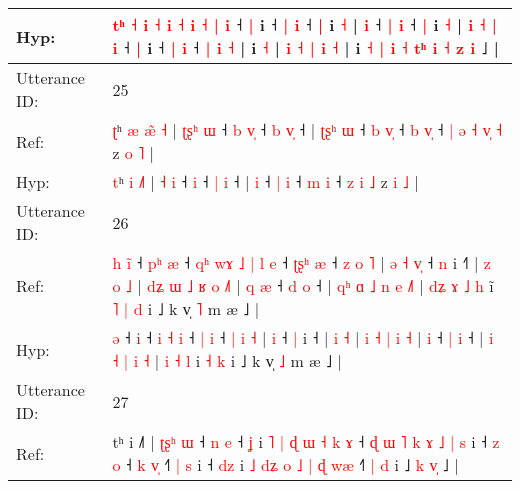 \documentclass[10pt]{article}
\DeclareRobustCommand{\hl}[1]{{\textcolor{red}{#1}}}
\begin{document}
\begin{longtable}{ll}
 \\
Hyp: & \hl{}\hl{}\hl{}\hl{}\hl{t}\hl{ʰ} \hl{}\hl{˧} \hl{i} \hl{˧} \hl{}\hl{i} \hl{˧} \hl{i} \hl{}\hl{˧} \hl{|} \hl{}\hl{i} ˧ \hl{}\hl{|} i ˧ \hl{|} \hl{i} ˧ \hl{|} i \hl{˧} |\hl{}\hl{}\hl{} \hl{i} ˧ \hl{|} \hl{i} ˧ \hl{|} i\hl{}\hl{}\hl{}\hl{} \hl{˧} | \hl{}\hl{}\hl{}\hl{i} \hl{}\hl{}\hl{}\hl{˧} \hl{|} \hl{i} ˧ \hl{|} i\hl{} ˧ \hl{}\hl{}\hl{|} \hl{i} ˧ \hl{}\hl{|} \hl{i} \hl{˧} |\hl{}\hl{}\hl{} i \hl{}\hl{˧} |\hl{}\hl{} \hl{}\hl{i} \hl{˧} \hl{|} \hl{}\hl{i} \hl{˧} |\hl{}\hl{} i \hl{˧} \hl{|} \hl{i} \hl{˧} \hl{t}\hl{ʰ}\hl{ }\hl{i} \hl{˧} \hl{z} \hl{i} ˩ |
 \\
\midrule
Utterance ID: & 25 \\
Ref: & \hl{ʈ}ʰ \hl{æ} \hl{æ}\hl{̃}\hl{ }\hl{˧} | \hl{ʈ}\hl{ʂ}\hl{ʰ} \hl{ɯ} ˧\hl{ }\hl{b} \hl{v}\hl{̩} ˧ \hl{b} \hl{v}\hl{̩} ˧ |\hl{ }\hl{ʈ}\hl{ʂ}\hl{ʰ} \hl{ɯ} ˧ \hl{b} \hl{v}\hl{̩} ˧ \hl{b} \hl{v}\hl{̩} ˧\hl{ }\hl{|}\hl{ }\hl{ə} \hl{˧} \hl{v}\hl{̩} \hl{˧} z \hl{o} \hl{˥} |
 \\
Hyp: & \hl{t}ʰ \hl{i} \hl{}\hl{}\hl{˩}\hl{˥} | \hl{}\hl{}\hl{˧} \hl{i} ˧\hl{}\hl{} \hl{}\hl{i} ˧ \hl{|} \hl{}\hl{i} ˧ |\hl{}\hl{}\hl{}\hl{} \hl{i} ˧ \hl{|} \hl{}\hl{i} ˧ \hl{m} \hl{}\hl{i} ˧\hl{}\hl{}\hl{}\hl{} \hl{z} \hl{}\hl{i} \hl{˩} z \hl{i} \hl{˩} |
 \\
\midrule
Utterance ID: & 26 \\
Ref: & \hl{h}\hl{ }\hl{i}\hl{̃} ˧\hl{ }\hl{p}\hl{ʰ} \hl{æ} ˧\hl{ }\hl{q}\hl{ʰ}\hl{ }\hl{w}\hl{ɤ}\hl{ }\hl{˩} \hl{|} \hl{l} \hl{e} ˧ \hl{ʈ}\hl{ʂ}\hl{ʰ} \hl{æ} ˧ \hl{z} \hl{o} \hl{˥} |\hl{ }\hl{ə}\hl{ }\hl{˧} \hl{v}\hl{̩} ˧ \hl{n} i ˧\hl{˥} |\hl{ }\hl{z} \hl{o} \hl{˩} |\hl{ }\hl{d}\hl{ʑ} \hl{ɯ} \hl{˩} \hl{ʁ} \hl{o} \hl{˩}\hl{˥} |\hl{ }\hl{q} \hl{æ} ˧ \hl{d} \hl{o} ˧ |\hl{ }\hl{q}\hl{ʰ} \hl{ɑ} \hl{˩} \hl{n} \hl{e} \hl{˩}\hl{˥} |\hl{ }\hl{d}\hl{ʑ} \hl{ɤ} \hl{˩} \hl{h} i\hl{̃}\hl{ }\hl{˥} \hl{|} \hl{d} i ˩ k v̩ \hl{˥} m æ ˩ |
 \\
Hyp: & \hl{}\hl{}\hl{}\hl{ə} ˧\hl{}\hl{}\hl{} \hl{i} ˧\hl{}\hl{}\hl{}\hl{}\hl{}\hl{}\hl{}\hl{} \hl{i} \hl{˧} \hl{i} ˧ \hl{}\hl{}\hl{|} \hl{i} ˧ \hl{|} \hl{i} \hl{˧} |\hl{}\hl{}\hl{}\hl{} \hl{}\hl{i} ˧ \hl{|} i ˧\hl{} |\hl{}\hl{} \hl{i} \hl{˧} |\hl{}\hl{}\hl{} \hl{i} \hl{˧} \hl{|} \hl{i} \hl{}\hl{˧} |\hl{}\hl{} \hl{i} ˧ \hl{|} \hl{i} ˧ |\hl{}\hl{}\hl{} \hl{i} \hl{˧} \hl{|} \hl{i} \hl{}\hl{˧} |\hl{}\hl{}\hl{} \hl{i} \hl{˧} \hl{l} i\hl{}\hl{}\hl{} \hl{˧} \hl{k} i ˩ k v̩ \hl{˩} m æ ˩ |
 \\
\midrule
Utterance ID: & 27 \\
Ref: & tʰ i ˩˥ |\hl{ }\hl{ʈ}\hl{ʂ}\hl{ʰ}\hl{ }\hl{ɯ} ˧\hl{ }\hl{n} \hl{e} ˧\hl{ }\hl{ʝ} i\hl{ }\hl{˥}\hl{ }\hl{|}\hl{ }\hl{ɖ} \hl{ɯ} \hl{˧}\hl{ }\hl{k} \hl{ɤ} ˧ \hl{ɖ}\hl{ }\hl{ɯ} \hl{˥} \hl{k} \hl{ɤ} \hl{˩} \hl{|} \hl{s} i ˧ \hl{z} \hl{o} ˧ \hl{k} \hl{v}\hl{̩} ˧\hl{˥}\hl{ }\hl{|} \hl{s} i ˧ \hl{d}\hl{z} i\hl{ }\hl{˩} \hl{d}\hl{ʑ} \hl{o} \hl{˩} \hl{|} \hl{ɖ} \hl{w}\hl{æ} ˧\hl{˥}\hl{ }\hl{|} \hl{d} i ˩ \hl{k} \hl{v}\hl{̩} ˩ |

\end{longtable}
\end{document}

